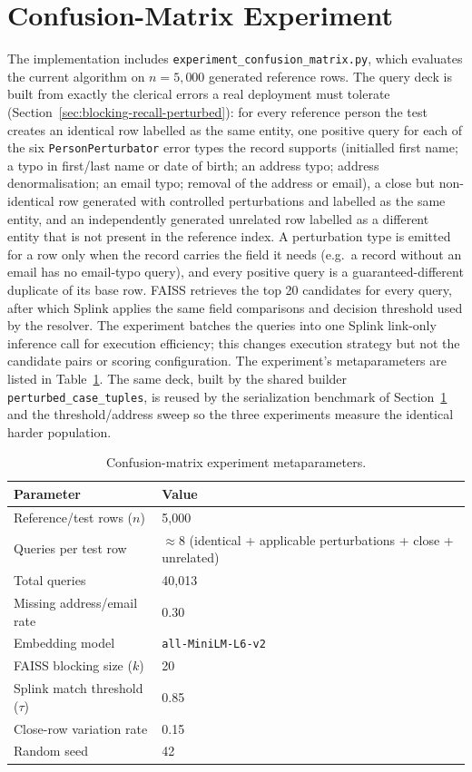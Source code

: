 \documentclass[11pt]{article}
\begin{document}
\section{Confusion-Matrix Experiment}
\label{sec:confusion-matrix}
The implementation includes \texttt{experiment\_confusion\_matrix.py}, which evaluates the current algorithm on $n=5{,}000$ generated reference rows. The query deck is built from exactly the clerical errors a real deployment must tolerate (Section~\ref{sec:blocking-recall-perturbed}): for every reference person the test creates an identical row labelled as the same entity, one positive query for each of the six \texttt{PersonPerturbator} error types the record supports (initialled first name; a typo in first/last name or date of birth; an address typo; address denormalisation; an email typo; removal of the address or email), a close but non-identical row generated with controlled perturbations and labelled as the same entity, and an independently generated unrelated row labelled as a different entity that is not present in the reference index. A perturbation type is emitted for a row only when the record carries the field it needs (e.g.\ a record without an email has no email-typo query), and every positive query is a guaranteed-different duplicate of its base row. FAISS retrieves the top 20 candidates for every query, after which Splink applies the same field comparisons and decision threshold used by the resolver. The experiment batches the queries into one Splink link-only inference call for execution efficiency; this changes execution strategy but not the candidate pairs or scoring configuration. The experiment's metaparameters are listed in Table~\ref{tab:confusion-metaparameters}. The same deck, built by the shared builder \texttt{perturbed\_case\_tuples}, is reused by the serialization benchmark of Section~\ref{sec:confusion-matrix} and the threshold/address sweep so the three experiments measure the identical harder population.

\begin{table}[h]
\centering
\caption{Confusion-matrix experiment metaparameters.}
\label{tab:confusion-metaparameters}
\begin{tabular}{ll}
\toprule
Parameter & Value \\
\midrule
Reference/test rows ($n$) & 5,000 \\
Queries per test row & $\approx 8$ (identical + applicable perturbations + close + unrelated) \\
Total queries & 40,013 \\
Missing address/email rate & 0.30 \\
Embedding model & \texttt{all-MiniLM-L6-v2} \\
FAISS blocking size ($k$) & 20 \\
Splink match threshold ($\tau$) & 0.85 \\
Close-row variation rate & 0.15 \\
Random seed & 42 \\
\bottomrule
\end{tabular}
\end{table}
\end{document}
